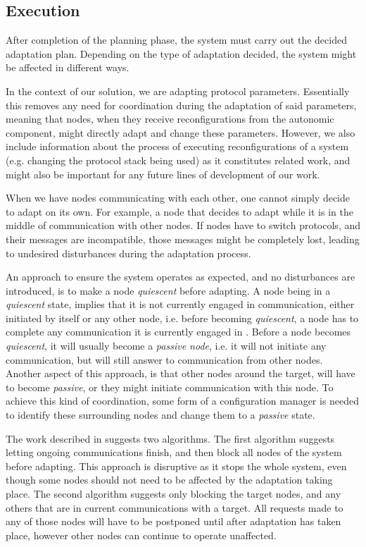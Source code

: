 \subsection{Execution}
\label{ssec:execution}

After completion of the planning phase, the system must carry out the decided adaptation plan. Depending on the type of adaptation decided, the system might be affected in different ways.

In the context of our solution, we are adapting protocol parameters. Essentially this removes any need for coordination during the adaptation of said parameters, meaning that nodes, when they receive reconfigurations from the autonomic component, might directly adapt and change these parameters. However, we also include information about the process of executing reconfigurations of a system (e.g. changing the protocol stack being used) as it constitutes related work, and might also be important for any future lines of development of our work.

When we have nodes communicating with each other, one cannot simply decide to adapt on its own. For example, a node that decides to adapt while it is in the middle of communication with other nodes. If nodes have to switch protocols, and their messages are incompatible, those messages might be completely lost, leading to undesired disturbances during the adaptation process.

An approach to ensure the system operates as expected, and no disturbances are introduced, is to make a node \textit{quiescent} before adapting. A node being in a \textit{quiescent} state, implies that it is not currently engaged in communication, either initiated by itself or any other node, i.e. before becoming \textit{quiescent}, a node has to complete any communication it is currently engaged in \cite{Kramer1998}. Before a node becomes \textit{quiescent}, it will usually become a \textit{passive node}, i.e. it will not initiate any communication, but will still answer to communication from other nodes. Another aspect of this approach, is that other nodes around the target, will have to become \textit{passive}, or they might initiate communication with this node. To achieve this kind of coordination, some form of a configuration manager is needed to identify these surrounding nodes and change them to a \textit{passive} state.

The work described in \cite{Goudarzi1996} suggests two algorithms. The first algorithm suggests letting ongoing communications finish, and then block all nodes of the system before adapting. This approach is disruptive as it stops the whole system, even though some nodes should not need to be affected by the adaptation taking place. The second algorithm suggests only blocking the target nodes, and any others that are in current communications with a target. All requests made to any of those nodes will have to be postponed until after adaptation has taken place, however other nodes can continue to operate unaffected.

